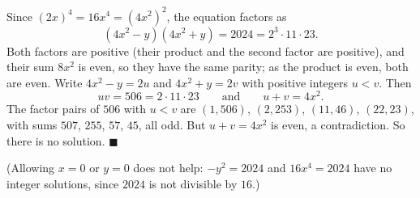 Since $(2x)^4=16x^4=\left(4x^2\right)^2$, the equation factors as
\[\left(4x^2-y\right)\left(4x^2+y\right)=2024=2^3\cdot11\cdot23.\]
Both factors are positive (their product and the second factor are positive), and their sum $8x^2$ is even, so they have the same parity; as the product is even, both are even. Write $4x^2-y=2u$ and $4x^2+y=2v$ with positive integers $u<v$. Then
\[uv=506=2\cdot11\cdot23\qquad\text{and}\qquad u+v=4x^2.\]
The factor pairs of $506$ with $u<v$ are $(1,506)$, $(2,253)$, $(11,46)$, $(22,23)$, with sums $507$, $255$, $57$, $45$, all odd. But $u+v=4x^2$ is even, a contradiction. So there is no solution. $\blacksquare$

(Allowing $x=0$ or $y=0$ does not help: $-y^2=2024$ and $16x^4=2024$ have no integer solutions, since $2024$ is not divisible by $16$.)
